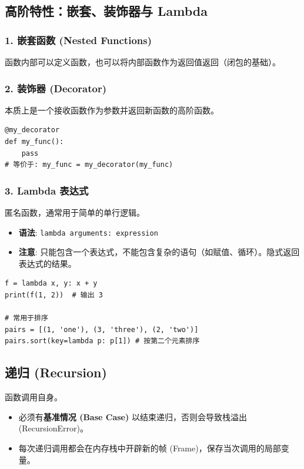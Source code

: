 \documentclass[12pt, a4paper]{article}
\begin{document}
\subsection{高阶特性：嵌套、装饰器与 Lambda}

\subsubsection{1. 嵌套函数 (Nested Functions)}
函数内部可以定义函数，也可以将内部函数作为返回值返回（闭包的基础）。

\subsubsection{2. 装饰器 (Decorator)}
本质上是一个接收函数作为参数并返回新函数的高阶函数。
\begin{lstlisting}
@my_decorator
def my_func():
    pass
# 等价于: my_func = my_decorator(my_func)
\end{lstlisting}

\subsubsection{3. Lambda 表达式}
匿名函数，通常用于简单的单行逻辑。
\begin{itemize}
    \item \textbf{语法}: \texttt{lambda arguments: expression}
    \item \textbf{注意}: 只能包含一个表达式，不能包含复杂的语句（如赋值、循环）。隐式返回表达式的结果。
\end{itemize}
\begin{lstlisting}
f = lambda x, y: x + y
print(f(1, 2))  # 输出 3

# 常用于排序
pairs = [(1, 'one'), (3, 'three'), (2, 'two')]
pairs.sort(key=lambda p: p[1]) # 按第二个元素排序
\end{lstlisting}

\subsection{递归 (Recursion)}
函数调用自身。
\begin{itemize}
    \item 必须有\textbf{基准情况 (Base Case)} 以结束递归，否则会导致栈溢出 (RecursionError)。
    \item 每次递归调用都会在内存栈中开辟新的帧 (Frame)，保存当次调用的局部变量。
\end{itemize}
\end{document}
